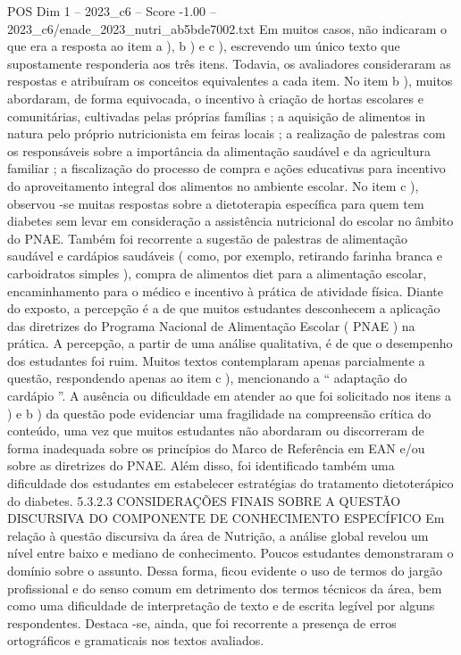 \begin{textsample}{POS Dim 1 – 2023\_c6 – Score -1.00 – 2023\_c6/enade\_2023\_nutri\_ab5bde7002.txt}
Em muitos casos, não indicaram o que era a resposta ao item a ), b ) e c ), escrevendo um único texto que supostamente responderia aos três itens.
Todavia, os avaliadores consideraram as respostas e atribuíram os conceitos equivalentes a cada item.
No item b ), muitos abordaram, de forma equivocada, o incentivo à criação de hortas escolares e comunitárias, cultivadas pelas próprias famílias ; a aquisição de alimentos in natura pelo próprio nutricionista em feiras locais ; a realização de palestras com os responsáveis sobre a importância da alimentação saudável e da agricultura familiar ; a fiscalização do processo de compra e ações educativas para incentivo do aproveitamento integral dos alimentos no ambiente escolar.
No item c ), observou -se muitas respostas sobre a dietoterapia específica para quem tem diabetes sem levar em consideração a assistência nutricional do escolar no âmbito do PNAE.
Também foi recorrente a sugestão de palestras de alimentação saudável e cardápios saudáveis ( como, por exemplo, retirando farinha branca e carboidratos simples ), compra de alimentos diet para a alimentação escolar, encaminhamento para o médico e incentivo à prática de atividade física.
Diante do exposto, a percepção é a de que muitos estudantes desconhecem a aplicação das diretrizes do Programa Nacional de Alimentação Escolar ( PNAE ) na prática.
A percepção, a partir de uma análise qualitativa, é de que o desempenho dos estudantes foi ruim.
Muitos textos contemplaram apenas parcialmente a questão, respondendo apenas ao item c ), mencionando a “ adaptação do cardápio ”.
A ausência ou dificuldade em atender ao que foi solicitado nos itens a ) e b ) da questão pode evidenciar uma fragilidade na compreensão crítica do conteúdo, uma vez que muitos estudantes não abordaram ou discorreram de forma inadequada sobre os princípios do Marco de Referência em EAN e/ou sobre as diretrizes do PNAE.
Além disso, foi identificado também uma dificuldade dos estudantes em estabelecer estratégias do tratamento dietoterápico do diabetes. 5.3.2.3 CONSIDERAÇÕES FINAIS SOBRE A QUESTÃO DISCURSIVA DO COMPONENTE DE CONHECIMENTO ESPECÍFICO Em relação à questão discursiva da área de Nutrição, a análise global revelou um nível entre baixo e mediano de conhecimento.
Poucos estudantes demonstraram o domínio sobre o assunto.
Dessa forma, ficou evidente o uso de termos do jargão profissional e do senso comum em detrimento dos termos técnicos da área, bem como uma dificuldade de interpretação de texto e de escrita legível por alguns respondentes.
Destaca -se, ainda, que foi recorrente a presença de erros ortográficos e gramaticais nos textos avaliados.

\end{textsample}
